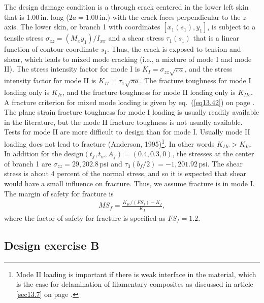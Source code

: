 \documentclass{AeroStructure-ERJohnson}
\begin{document}
The design damage condition is a through crack centered in the lower left skin that is 1.00\,in. long ($2 a=1.00\,\mathrm{in} $.) with the crack faces perpendicular to the $z$-axis. The lower skin, or branch 1 with coordinates $\left[x_{1}\left(s_{1}\right), y_{1}\right]$, is subject to a tensile stress $\sigma_{z z}=\left(M_{x} y_{1}\right)/I_{x x}$ and a shear stress $\tau_{1}\left(s_{1}\right)$ that is a linear function of contour coordinate $s_1$. Thus, the crack is exposed to tension and shear, which leads to mixed mode cracking (i.e., a mixture of mode I and mode II). The stress intensity factor for mode I is $K_{I}=\sigma_{z z} \sqrt{\pi a}$, and the stress intensity factor for mode II is $K_{I I}=\tau_{1} \sqrt{\pi a}$. The fracture toughness for mode I loading only is $K_{I c}$, and the fracture toughness for mode II loading only is $K_{I I c}$. A fracture criterion for mixed mode loading is given by eq.~(\ref{eq13.42}) on page \pageref{eq13.42}. The plane strain fracture toughness for mode I loading is usually readily available in the literature, but the mode II fracture toughness is not usually available. Tests for mode II are more difficult to design than for mode I. Usually mode II loading does not lead to fracture (Anderson, 1995)\footnote{Mode II loading is important if there is weak interface in the material, which is the case for delamination of filamentary composites as discussed in article \ref{sec13.7} on page \pageref{sec13.7}.}. In other words $K_{I I c}>K_{I c}$. In addition for the design\break $(t_{f}, t_{w}, A_{f})=(0.4,0.3,0)$, the stresses at the center of branch 1 are $\sigma_{z z}=29{,}202.8\,\mathrm{psi}$ and $\tau_{3}\left(b_{f}/2\right)=-1{,}201.92\,\mathrm{psi}$. The shear stress is about 4 percent of the normal stress, and so it is expected that shear would have a small influence on fracture. Thus, we assume fracture is in mode I. The margin of safety for fracture is
\begin{align}\label{eq14.41}
M S_{f}=\frac{K_{I c} /\left(F S_{f}\right)-K_{I}}{K_{I}},
\end{align}
where the factor of safety for fracture is specified as $F S_{f}=1.2$.


\subsection{Design exercise B}\label{sec14.3.3}
\end{document}
